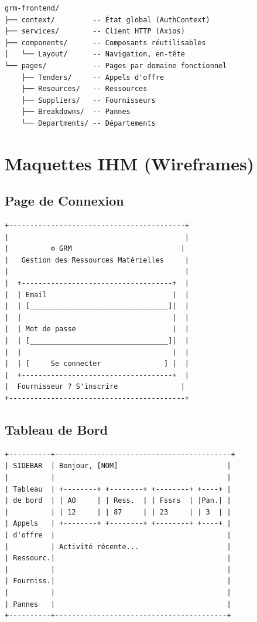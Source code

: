 \begin{verbatim}
grm-frontend/
├── context/         -- État global (AuthContext)
├── services/        -- Client HTTP (Axios)
├── components/      -- Composants réutilisables
│   └── Layout/      -- Navigation, en-tête
└── pages/           -- Pages par domaine fonctionnel
    ├── Tenders/     -- Appels d'offre
    ├── Resources/   -- Ressources
    ├── Suppliers/   -- Fournisseurs
    ├── Breakdowns/  -- Pannes
    └── Departments/ -- Départements
\end{verbatim}

\section{Maquettes IHM (Wireframes)}

\subsection{Page de Connexion}

\begin{verbatim}
+------------------------------------------+
|                                          |
|          ⚙ GRM                          |
|   Gestion des Ressources Matérielles     |
|                                          |
|  +------------------------------------+  |
|  | Email                              |  |
|  | [_________________________________]|  |
|  |                                    |  |
|  | Mot de passe                       |  |
|  | [_________________________________]|  |
|  |                                    |  |
|  | [     Se connecter               ] |  |
|  +------------------------------------+  |
|  Fournisseur ? S'inscrire               |
+------------------------------------------+
\end{verbatim}

\subsection{Tableau de Bord}

\begin{verbatim}
+----------+------------------------------------------+
| SIDEBAR  | Bonjour, [NOM]                          |
|          |                                         |
| Tableau  | +--------+ +--------+ +--------+ +----+ |
| de bord  | | AO     | | Ress.  | | Fssrs  | |Pan.| |
|          | | 12     | | 87     | | 23     | | 3  | |
| Appels   | +--------+ +--------+ +--------+ +----+ |
| d'offre  |                                         |
|          | Activité récente...                     |
| Ressourc.|                                         |
|          |                                         |
| Fourniss.|                                         |
|          |                                         |
| Pannes   |                                         |
+----------+-----------------------------------------+
\end{verbatim}

